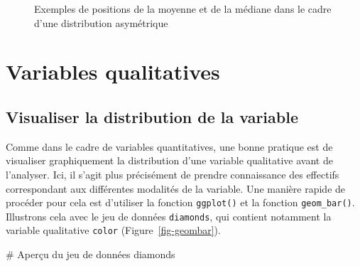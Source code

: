 \documentclass[
  letterpaper,
]{book}
\newenvironment{Shaded}{\begin{snugshade}}{\end{snugshade}}
\newcommand{\CommentTok}[1]{\textcolor[rgb]{0.37,0.37,0.37}{#1}}
\newcommand{\NormalTok}[1]{\textcolor[rgb]{0.00,0.23,0.31}{#1}}
\begin{document}
\begin{figure}


\caption{\label{fig-MeanAboveLedianAsym}Exemples de positions de la
moyenne et de la médiane dans le cadre d'une distribution asymétrique}

\end{figure}%

\section{Variables qualitatives}\label{variables-qualitatives}

\subsection{Visualiser la distribution de la
variable}\label{visualiser-la-distribution-de-la-variable-1}

Comme dans le cadre de variables quantitatives, une bonne pratique est
de visualiser graphiquement la distribution d'une variable qualitative
avant de l'analyser. Ici, il s'agit plus précisément de prendre
connaissance des effectifs correspondant aux différentes modalités de la
variable. Une manière rapide de procéder pour cela est d'utiliser la
fonction \texttt{ggplot()} et la fonction \texttt{geom\_bar()}.
Illustrons cela avec le jeu de données \texttt{diamonds}, qui contient
notamment la variable qualitative \texttt{color}
(Figure~\ref{fig-geombar}).

\begin{Shaded}
\begin{Highlighting}[]
\CommentTok{\# Aperçu du jeu de données}
\NormalTok{diamonds}
\end{Highlighting}
\end{Shaded}
\end{document}
